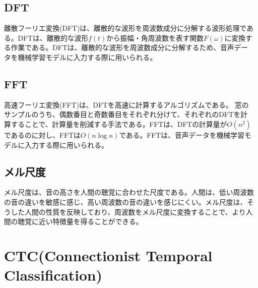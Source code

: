 \documentclass{ltjsarticle}
\begin{document}
\subsection{DFT}
離散フーリエ変換(DFT)は、離散的な波形を周波数成分に分解する波形処理である。DFTは、離散的な波形$f(t)$から振幅・角周波数を表す関数$F(\omega)$に変換する作業である。DFTは、離散的な波形を周波数成分に分解するため、音声データを機械学習モデルに入力する際に用いられる。

\subsection{FFT}
高速フーリエ変換(FFT)は、DFTを高速に計算するアルゴリズムである。
窓のサンプルのうち、偶数番目と奇数番目をそれぞれ分けて、それぞれのDFTを計算することで、計算量を削減する手法である。FFTは、DFTの計算量が$O(n^2)$であるのに対し、FFTは$O(n\log n)$である。FFTは、音声データを機械学習モデルに入力する際に用いられる。

\subsection{メル尺度}
メル尺度は、音の高さを人間の聴覚に合わせた尺度である。人間は、低い周波数の音の違いを敏感に感じ、高い周波数の音の違いを感じにくい。メル尺度は、そうした人間の性質を反映しており、周波数をメル尺度に変換することで、より人間の聴覚に近い特徴量を得ることができる。

\clearpage
\section{CTC(Connectionist Temporal Classification)}
\end{document}

